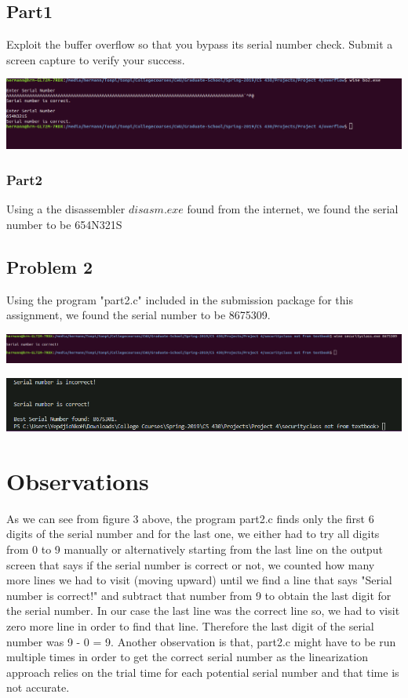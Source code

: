 \documentclass[12pt]{article}
\begin{document}
			\subsection{Part1}
				Exploit the buffer overflow so that you bypass its serial number check. Submit a screen capture to verify your success.
				
				\includegraphics[width=\linewidth]{Problem_1.png}
				
			\subsubsection{Part2}
				Using a the disassembler $disasm.exe$ found from the internet, we found the serial number to be 654N321S
			
		\subsection{Problem 2}
		
			Using the program "part2.c" included in the submission package for this assignment, we found the serial number to be 8675309.
			
			\includegraphics[width=\linewidth]{part2.png}
			
			\includegraphics[width=\linewidth]{part2_2.png}
			
		\section{Observations}
			As we can see from figure 3 above, the program part2.c finds only the first 6 digits of the serial number and for the last one, we either had to try all digits from  0 to 9 manually or alternatively starting from the last line on the output screen that says if the serial number is correct or not, we counted how many more lines we had to visit (moving upward) until we find a line that says "Serial number is correct!" and subtract that number from 9 to obtain the last digit for the serial number. In our case the last line was the correct line so, we had to visit zero more line in order to find that line. Therefore the last digit of the serial number was 9 - 0 = 9. 
			Another observation is that, part2.c might have to be run multiple times in order to get the correct serial number as the linearization approach relies on the trial time for each potential serial number and that time is not accurate. 
			
			
			
			
				
	
\end{document}
